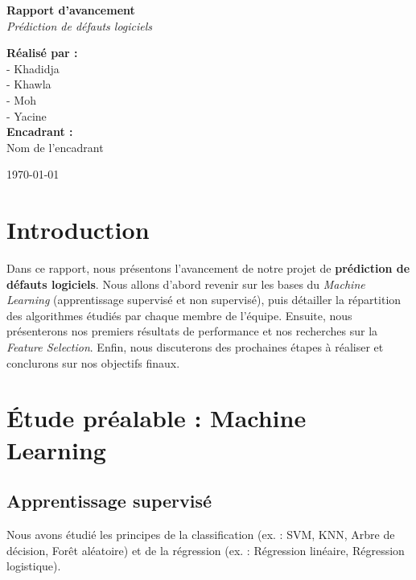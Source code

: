 \documentclass[12pt,a4paper]{report}
\begin{document}
\begin{titlepage}
    \centering
    \vspace*{2cm}
    {\Huge \textbf{Rapport d'avancement}\\[0.5cm]
     \Large \textit{Prédiction de défauts logiciels}}
    
    \vfill
    \textbf{Réalisé par :}\\[0.2cm]
    - Khadidja\\
    - Khawla\\
    - Moh\\
    - Yacine\\[1cm]
    
    \textbf{Encadrant :}\\[0.2cm]
    Nom de l'encadrant
    
    \vfill
    {\large \today}
\end{titlepage}

\tableofcontents
\newpage

\chapter{Introduction}
Dans ce rapport, nous présentons l'avancement de notre projet de \textbf{prédiction de défauts logiciels}. 
Nous allons d'abord revenir sur les bases du \textit{Machine Learning} (apprentissage supervisé et non supervisé), 
puis détailler la répartition des algorithmes étudiés par chaque membre de l'équipe. 
Ensuite, nous présenterons nos premiers résultats de performance et nos recherches sur la \textit{Feature Selection}.
Enfin, nous discuterons des prochaines étapes à réaliser et conclurons sur nos objectifs finaux.

\chapter{Étude préalable : Machine Learning}
\section{Apprentissage supervisé}
Nous avons étudié les principes de la classification (ex. : SVM, KNN, Arbre de décision, Forêt aléatoire) 
et de la régression (ex. : Régression linéaire, Régression logistique).
\end{document}
